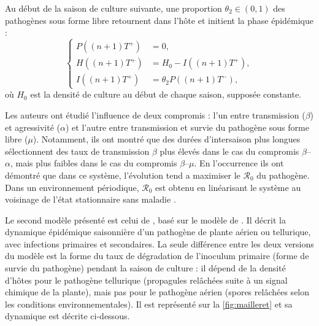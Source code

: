 \begin{enumerate}
	  Au début de la saison de culture suivante, une proportion $\theta_2 \in (0,1)$ des pathogènes sous forme libre retournent dans l'hôte et initient la phase épidémique :
	  \begin{equation}
	   \left\{
	      \begin{aligned}
	        P((n+1)T^{+}) &= 0,\\
	        H((n+1)T^{+}) &=H_0 - I((n+1)T^{+}),   \\
	        I((n+1)T^{+}) &=\theta_2 P((n + 1)T^-),
	      \end{aligned}
	    \right.
	    \label{eq:vandenberg-plant}
	  \end{equation}
	  où  $H_0$ est la densité de culture au début de chaque saison, supposée constante.
	\end{enumerate}	
	
	Les auteurs ont étudié l'influence de deux compromis : l’un entre transmission ($\beta$) et agressivité ($\alpha$) et l'autre entre transmission et survie du pathogène sous forme libre ($\mu$). Notamment, ils ont montré  que des durées d'intersaison plus longues sélectionnent des taux de transmission $\beta$ plus élevés dans le cas du compromis $\beta$--$\alpha$, mais plus faibles dans le cas du compromis $\beta$--$\mu$. En l’occurrence ils ont démontré que dans ce système, l’évolution tend a maximiser le $\mathscr{R}_0$ du pathogène.
Dans un environnement périodique,  $\mathscr{R}_0$ est obtenu en linéarisant le système au voisinage de l'état stationnaire sans maladie \citep{Bacaer2006, Bacaer2007}.

	
	Le second modèle présenté est celui de \citet{Mailleret2012}, basé sur le modèle de \citet{Madden2002}. Il décrit la dynamique épidémique saisonnière d'un pathogène de plante aérien ou tellurique, avec infections primaires et secondaires. La seule différence entre les deux versions du modèle est la forme du taux de dégradation de l'inoculum primaire (forme de survie du pathogène) pendant la saison de culture : il dépend de la densité d'hôtes pour le pathogène tellurique (propagules relâchées suite à un signal chimique de la plante), mais pas pour le pathogène aérien (spores relâchées selon les conditions environnementales). Il est représenté sur la \autoref{fig:mailleret} et sa dynamique est décrite ci-dessous.
	
